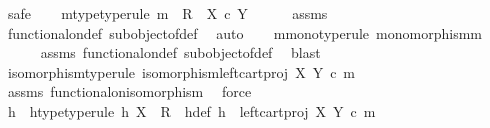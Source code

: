 \begin{isabellebody}
%
\isadelimproof
%
\endisadelimproof
%
\isatagproof
{}\isamarkupfalse%
\ safe\isanewline
\ \ \isamarkupfalse%
\ m{\isacharunderscore}{\kern0pt}type{\isacharbrackleft}{\kern0pt}type{\isacharunderscore}{\kern0pt}rule{\isacharbrackright}{\kern0pt}{\isacharcolon}{\kern0pt}\ {\isachardoublequoteopen}m\ {\isacharcolon}{\kern0pt}\ R\ {\isasymrightarrow}\ X\ {\isasymtimes}\isactrlsub c\ Y{\isachardoublequoteclose}\isanewline
\ \ \ \ \isamarkupfalse%
\ assms\ \isamarkupfalse%
\ functional{\isacharunderscore}{\kern0pt}on{\isacharunderscore}{\kern0pt}def\ subobject{\isacharunderscore}{\kern0pt}of{\isacharunderscore}{\kern0pt}def{}\ \isamarkupfalse%
\ auto\isanewline
\ \ \isamarkupfalse%
\ m{\isacharunderscore}{\kern0pt}mono{\isacharbrackleft}{\kern0pt}type{\isacharunderscore}{\kern0pt}rule{\isacharbrackright}{\kern0pt}{\isacharcolon}{\kern0pt}\ {\isachardoublequoteopen}monomorphism{\isacharparenleft}{\kern0pt}m{\isacharparenright}{\kern0pt}{\isachardoublequoteclose}\isanewline
\ \ \ \ \isamarkupfalse%
\ assms\ functional{\isacharunderscore}{\kern0pt}on{\isacharunderscore}{\kern0pt}def\ subobject{\isacharunderscore}{\kern0pt}of{\isacharunderscore}{\kern0pt}def{}\ \isamarkupfalse%
\ blast\isanewline
\ \ \isamarkupfalse%
\ isomorphism{\isacharbrackleft}{\kern0pt}type{\isacharunderscore}{\kern0pt}rule{\isacharbrackright}{\kern0pt}{\isacharcolon}{\kern0pt}\ {\isachardoublequoteopen}isomorphism{\isacharparenleft}{\kern0pt}left{\isacharunderscore}{\kern0pt}cart{\isacharunderscore}{\kern0pt}proj\ X\ Y\ {\isasymcirc}\isactrlsub c\ m{\isacharparenright}{\kern0pt}{\isachardoublequoteclose}\isanewline
\ \ \ \ \isamarkupfalse%
\ assms\ functional{\isacharunderscore}{\kern0pt}on{\isacharunderscore}{\kern0pt}isomorphism\ \isamarkupfalse%
\ force\isanewline
\ \ \isanewline
\ \ \isamarkupfalse%
\ h\ \ h{\isacharunderscore}{\kern0pt}type{\isacharbrackleft}{\kern0pt}type{\isacharunderscore}{\kern0pt}rule{\isacharbrackright}{\kern0pt}{\isacharcolon}{\kern0pt}\ {\isachardoublequoteopen}h{\isacharcolon}{\kern0pt}\ X\ {\isasymrightarrow}\ R{\isachardoublequoteclose}\ \ h{\isacharunderscore}{\kern0pt}def{\isacharcolon}{\kern0pt}\ {\isachardoublequoteopen}h\ {\isacharequal}{\kern0pt}\ {\isacharparenleft}{\kern0pt}left{\isacharunderscore}{\kern0pt}cart{\isacharunderscore}{\kern0pt}proj\ X\ Y\ {\isasymcirc}\isactrlsub c\ m{\isacharparenright}{\kern0pt}\isactrlbold {\isasyminverse}{\isachardoublequoteclose}\isanewline

\end{isabellebody}
